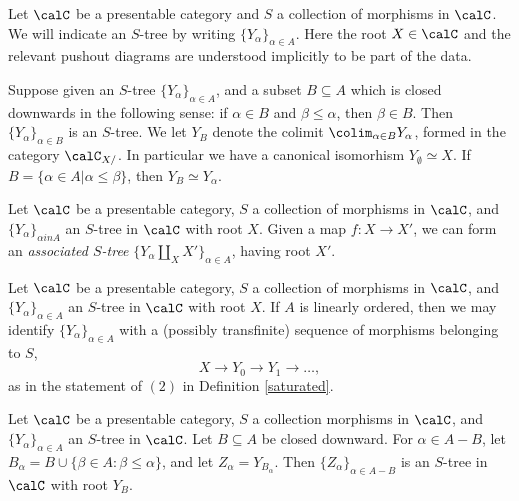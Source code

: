 \begin{CategoryTheory}
\begin{Didn't Read}
\begin{notation}
Let $\calC$ be a presentable category and $S$ a collection of morphisms in $\calC$. We will
indicate an $S$-tree by writing $\{ Y_{\alpha} \}_{\alpha \in A}$. Here the root $X \in \calC$ and the relevant pushout diagrams are understood implicitly to be part of the data.

Suppose given an $S$-tree $\{ Y_{\alpha} \}_{\alpha \in A}$, and a subset $B \subseteq A$ which is closed downwards in the following sense: if $\alpha \in B$ and $\beta \leq \alpha$, then $\beta \in B$. Then $\{ Y_{\alpha} \}_{\alpha \in B}$ is an $S$-tree. We let $Y_{B}$ denote the colimit
$\colim_{\alpha \in B} Y_{\alpha}$, formed in the category $\calC_{X/}$. In particular we have a canonical isomorhism
$Y_{\emptyset} \simeq X$. If $B = \{ \alpha \in A| \alpha \leq \beta \}$, then $Y_{B} \simeq Y_{\alpha}$. 
\end{notation}

\begin{remark}\label{asstree}
Let $\calC$ be a presentable category, $S$ a collection of morphisms in $\calC$, and
$\{ Y_{\alpha} \}_{ \alpha in A}$ an $S$-tree in $\calC$ with root $X$. Given a map
$f: X \rightarrow X'$, we can form an {\it associated $S$-tree}
$ \{ Y_{\alpha} \coprod_{X} X' \}_{\alpha \in A}$, having root $X'$.
\end{remark}

\begin{example}
Let $\calC$ be a presentable category, $S$ a collection of morphisms in $\calC$, and
$\{ Y_{\alpha} \}_{\alpha \in A}$ an $S$-tree in $\calC$ with root $X$. If $A$ is linearly ordered, then we may identify $\{ Y_{\alpha} \}_{\alpha \in A}$ with a (possibly transfinite) sequence of morphisms belonging to $S$,
$$ X \rightarrow Y_0 \rightarrow Y_1 \rightarrow \ldots, $$
as in the statement of $(2)$ in Definition \ref{saturated}.
\end{example}

\begin{remark}\label{relci}
Let $\calC$ be a presentable category, $S$ a collection morphisms in $\calC$, and
$\{Y_{\alpha} \}_{\alpha \in A}$ an $S$-tree in $\calC$. Let $B \subseteq A$ be closed downward. 
For $\alpha \in A - B$, let $B_{\alpha} = B \cup \{ \beta \in A: \beta \leq \alpha \}$, and let
$Z_{\alpha} = Y_{B_{\alpha}}$. Then $ \{ Z_{\alpha} \}_{ \alpha \in A-B}$ is an $S$-tree in
$\calC$ with root $Y_{B}$.
\end{remark}


\end{Didn't Read}
\end{CategoryTheory}
